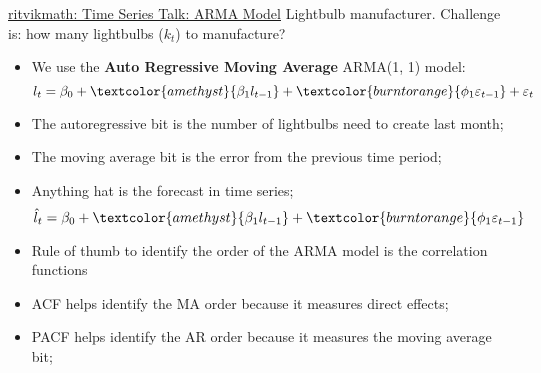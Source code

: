 \documentclass[12pt, titlepage, french]{report}
\begin{document}
\begin{YTB_SUMM}{\href{https://www.youtube.com/watch?v=HhvTlaN06AM&list=PLvcbYUQ5t0UHOLnBzl46_Q6QKtFgfMGc3&index=8}{ritvikmath: Time Series Talk: ARMA Model}}
Lightbulb manufacturer. Challenge is: how many lightbulbs ($k_{t}$) to manufacture?
\begin{itemize}
	\item	We use the \textbf{Auto Regressive Moving Average} \textcolor{amethyst}{AR}\textcolor{burntorange}{MA}(1, 1) model: 
	\begin{equation*}
		l_{t} = \beta_{0} + \textcolor{amethyst}{\beta_{1} l_{t - 1}} + \textcolor{burntorange}{\phi_{1} \varepsilon_{t - 1}} + \varepsilon_{t}
	\end{equation*}
	\item[]	The \textcolor{amethyst}{autoregressive bit} is the number of lightbulbs need to create last month;
	\item[]	The \textcolor{burntorange}{moving average bit} is the error from the previous time period;
	\item	Anything \og hat \fg{} is the forecast in time series;
	\begin{equation*}
		\hat{l}_{t} = \beta_{0} + \textcolor{amethyst}{\beta_{1} l_{t - 1}} + \textcolor{burntorange}{\phi_{1} \varepsilon_{t - 1}}
	\end{equation*}
	\item	Rule of thumb to identify the order of the ARMA model is the correlation functions
	\item[]	ACF helps identify the MA order because it measures direct effects;
	\item[]	PACF helps identify the AR order because it measures the moving average bit;
\end{itemize}
\end{YTB_SUMM}
\end{document}
